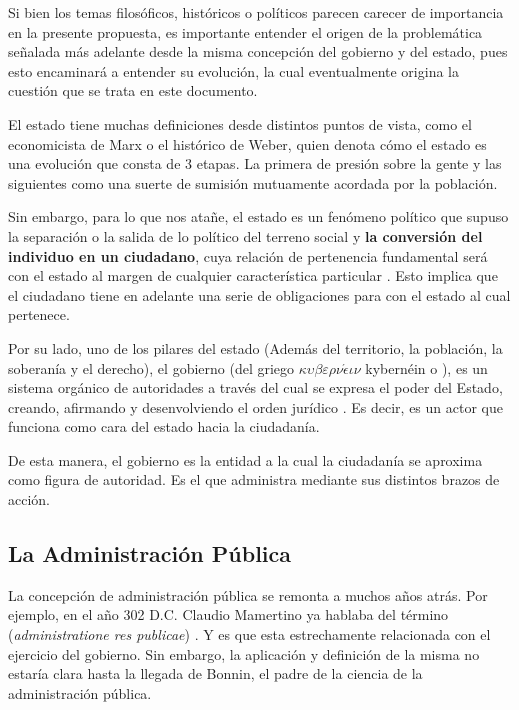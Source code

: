 Si bien los temas filosóficos, históricos o políticos parecen carecer de
importancia en la presente propuesta, es importante entender el origen de la
problemática señalada más adelante desde la misma concepción del gobierno y del
estado, pues esto encaminará a entender su evolución, la cual eventualmente
origina la cuestión que se trata en este documento.

El estado tiene muchas definiciones desde distintos puntos de vista, como el
economicista de Marx o el histórico de Weber, quien denota cómo el estado es una
evolución que consta de 3 etapas. La primera de presión sobre la gente y las
siguientes como una suerte de sumisión mutuamente acordada por la población.

Sin embargo, para lo que nos atañe, el estado es un fenómeno político que supuso
la separación o la salida de lo político del terreno social y \textbf{la
conversión del individuo en un ciudadano}, cuya relación de pertenencia
fundamental será con el estado al margen de cualquier característica particular
\cite{gordilloperezestadosurge}. Esto implica que el ciudadano tiene en adelante
una serie de obligaciones para con el estado al cual pertenece.


Por su lado, uno de los pilares del estado (Además del territorio, la población, la soberanía y el derecho), el gobierno (del griego
$\kappa \upsilon \beta \varepsilon \rho \nu \acute{\epsilon} \iota \nu$
kybernéin  o ), es un
sistema orgánico de autoridades a través del cual se expresa el poder del
Estado, creando, afirmando y desenvolviendo el orden jurídico
\cite{jorgefernandezruizdederecho}. Es decir, es un actor que
funciona como cara del estado hacia la ciudadanía.

De esta manera, el gobierno es la entidad a la cual la ciudadanía se aproxima como figura de autoridad. Es el que administra mediante sus distintos brazos de acción.

\subsection{La Administración Pública}

La concepción de administración pública se remonta a muchos años atrás. Por
ejemplo, en el año 302 D.C. Claudio Mamertino ya hablaba del término
 (\textit{administratione res publicae})
\cite{nixonsaylorinpraiseroman}. Y es que esta estrechamente relacionada con el
ejercicio del gobierno. Sin embargo, la aplicación y definición de la misma no
estaría clara hasta la llegada de Bonnin, el padre de la ciencia de la
administración pública.

